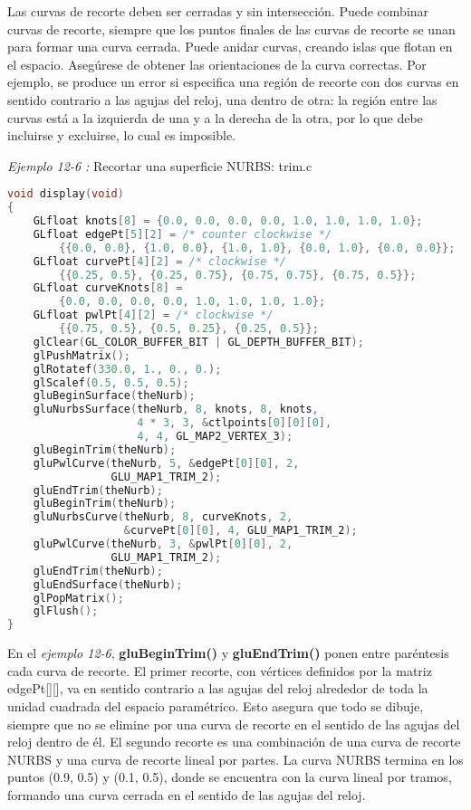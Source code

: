 Las curvas de recorte deben ser cerradas y sin intersección. Puede combinar
curvas de recorte, siempre que los puntos finales de las curvas de recorte
se unan para formar una curva cerrada. Puede anidar curvas, creando islas
que flotan en el espacio. Asegúrese de obtener las orientaciones de la
curva correctas. Por ejemplo, se produce un error si especifica una región
de recorte con dos curvas en sentido contrario a las agujas del reloj,
una dentro de otra: la región entre las curvas está a la izquierda de una
y a la derecha de la otra, por lo que debe incluirse y excluirse, lo cual es imposible.

\emph{Ejemplo 12-6 :} Recortar una superficie NURBS: trim.c

\begin{lstlisting}[language=C++]
void display(void)
{
    GLfloat knots[8] = {0.0, 0.0, 0.0, 0.0, 1.0, 1.0, 1.0, 1.0};
    GLfloat edgePt[5][2] = /* counter clockwise */
        {{0.0, 0.0}, {1.0, 0.0}, {1.0, 1.0}, {0.0, 1.0}, {0.0, 0.0}};
    GLfloat curvePt[4][2] = /* clockwise */
        {{0.25, 0.5}, {0.25, 0.75}, {0.75, 0.75}, {0.75, 0.5}};
    GLfloat curveKnots[8] =
        {0.0, 0.0, 0.0, 0.0, 1.0, 1.0, 1.0, 1.0};
    GLfloat pwlPt[4][2] = /* clockwise */
        {{0.75, 0.5}, {0.5, 0.25}, {0.25, 0.5}};
    glClear(GL_COLOR_BUFFER_BIT | GL_DEPTH_BUFFER_BIT);
    glPushMatrix();
    glRotatef(330.0, 1., 0., 0.);
    glScalef(0.5, 0.5, 0.5);
    gluBeginSurface(theNurb);
    gluNurbsSurface(theNurb, 8, knots, 8, knots,
                    4 * 3, 3, &ctlpoints[0][0][0],
                    4, 4, GL_MAP2_VERTEX_3);
    gluBeginTrim(theNurb);
    gluPwlCurve(theNurb, 5, &edgePt[0][0], 2,
                GLU_MAP1_TRIM_2);
    gluEndTrim(theNurb);
    gluBeginTrim(theNurb);
    gluNurbsCurve(theNurb, 8, curveKnots, 2,
                  &curvePt[0][0], 4, GLU_MAP1_TRIM_2);
    gluPwlCurve(theNurb, 3, &pwlPt[0][0], 2,
                GLU_MAP1_TRIM_2);
    gluEndTrim(theNurb);
    gluEndSurface(theNurb);
    glPopMatrix();
    glFlush();
}
\end{lstlisting}

En el \emph{ejemplo 12-6}, \textbf{gluBeginTrim()} y \textbf{gluEndTrim()}
ponen entre paréntesis cada curva de recorte. El primer recorte, con
vértices definidos por la matriz edgePt[][], va en sentido contrario
a las agujas del reloj alrededor de toda la unidad cuadrada del espacio
paramétrico. Esto asegura que todo se dibuje, siempre que no se elimine
por una curva de recorte en el sentido de las agujas del reloj dentro
de él. El segundo recorte es una combinación de una curva de recorte
NURBS y una curva de recorte lineal por partes. La curva NURBS termina
en los puntos (0.9, 0.5) y (0.1, 0.5), donde se encuentra con la curva
lineal por tramos, formando una curva cerrada en el sentido de las agujas del reloj.
